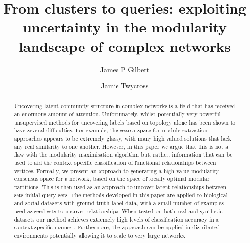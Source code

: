 \documentclass[sigconf]{acmart}
\begin{document}
\title{From clusters to queries: exploiting uncertainty in the modularity landscape of complex networks}

\author{James P Gilbert}

\author{Jamie Twycross}



\begin{abstract}
Uncovering latent community structure in complex networks is a field that has received an enormous amount of attention.
Unfortunately, whilst potentially very powerful unsupervised methods for uncovering labels based on topology alone has been shown to have several difficulties.
For example, the search space for module extraction approaches appears to be extremely glassy, with many high valued solutions that lack any real similarity to one another.
However, in this paper we argue that this is not a flaw with the modularity maximisation algorithm but, rather, information that can be used to aid the context specific classification of functional relationships between vertices.
Formally, we present an approach to generating a high value modularity consensus space for a network, based on the space of locally optimal modular partitions.
This is then used as an approach to uncover latent relationships between sets initial query sets.
The methods developed in this paper are applied to biological and social datasets with ground-truth label data, with a small number of examples used as seed sets to uncover relationships.
When tested on both real and synthetic datasets our method achieves extremely high levels of classification accuracy in a context specific manner.
Furthermore, the approach can be applied in distributed environments potentially allowing it to scale to very large networks.
\end{abstract}

\maketitle
\end{document}
